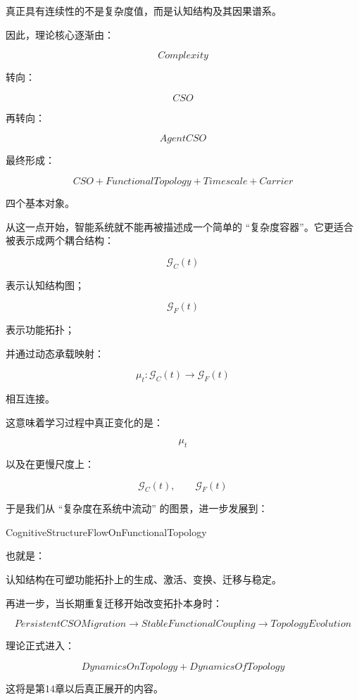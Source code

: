 \begin{statementbox}
真正具有连续性的不是复杂度值，而是认知结构及其因果谱系。
\end{statementbox}

因此，理论核心逐渐由：

\[
Complexity
\]

转向：

\[
CSO
\]

再转向：

\[
AgentCSO
\]

最终形成：

\[
\boxed{
CSO
+
FunctionalTopology
+
Timescale
+
Carrier
}
\]

四个基本对象。

从这一点开始，智能系统就不能再被描述成一个简单的 ``复杂度容器''。它更适合被表示成两个耦合结构：

\[
\mathcal G_C(t)
\]

表示认知结构图；

\[
\mathcal G_F(t)
\]

表示功能拓扑；

并通过动态承载映射：

\[
\mu_t:
\mathcal G_C(t)
\rightarrow
\mathcal G_F(t)
\]

相互连接。

这意味着学习过程中真正变化的是：

\[
\boxed{
\mu_t
}
\]

以及在更慢尺度上：

\[
\boxed{
\mathcal G_C(t),\qquad
\mathcal G_F(t)
}
\]

于是我们从 ``复杂度在系统中流动'' 的图景，进一步发展到：

\begin{statementbox}
CognitiveStructureFlowOnFunctionalTopology
\end{statementbox}

也就是：

\begin{statementbox}
认知结构在可塑功能拓扑上的生成、激活、变换、迁移与稳定。
\end{statementbox}

再进一步，当长期重复迁移开始改变拓扑本身时：

\[
PersistentCSOMigration
\rightarrow
StableFunctionalCoupling
\rightarrow
TopologyEvolution
\]

理论正式进入：

\[
\boxed{
DynamicsOnTopology
+
DynamicsOfTopology
}
\]

这将是第14章以后真正展开的内容。

